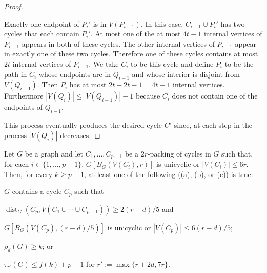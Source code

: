 \documentclass{patmorin}
\renewcommand{\ge}{\geqslant}
\renewcommand{\le}{\leqslant}
\DeclareMathOperator{\dist}{dist}
\begin{document}
\begin{proof}
\begin{compactenum}
    \item Exactly one endpoint of $P_i'$ is in $V(P_{i-1})$.  In this case, $C_{i-1}\cup P_i'$ has two cycles that each contain $P_i'$.  At most one of the at most $4t-1$ internal vertices of $P_{i-1}$ appears in both of these cycles. The other internal vertices of $P_{i-1}$ appear in exactly one of these two cycles.  Therefore one of these cycles contains at most $2t$ internal vertices of $P_{i-1}$.  We take $C_i$ to be this cycle and define $P_i$ to be the path in $C_i$ whose endpoints are in $Q_{i-1}$ and whose interior is disjoint from $V(Q_{i-1})$.  Then $P_i$ has at most $2t+2t-1= 4t-1$ internal vertices.  Furthermore $|V(Q_i)|\le |V(Q_{i-1})|-1$ because $C_i$ does not contain one of the endpoints of $Q_{i-1}$.
  \end{compactenum}
  This process eventually produces the desired cycle $C'$ since, at each step in the process $|V(Q_i)|$ decreases.
\end{proof}





\begin{lem}\label{a_or_b}
  Let $G$ be a graph and let $C_1,\ldots,C_{p-1}$ be a $2r$-packing of cycles in $G$ such that, for each $i\in\{1,\ldots,p-1\}$,  $G[B_G(V(C_i),r)]$ is unicyclic or $|V(C_i)|\le 6r$.  Then, for every $k\ge p-1$, at least one of the following ((a), (b), or (c)) is true:
  \begin{compactenum}[(a)]
    \item $G$ contains a cycle $C_p$ such that
    \begin{compactenum}[(i)]
      \item $\dist_G(C_p,V(C_1\cup\cdots\cup C_{p-1}))\ge 2(r-d)/5$ and
      \item $G[B_G(V(C_p),(r-d)/5)]$ is unicyclic or $|V(C_p)|\le 6(r-d)/5$;
    \end{compactenum}
    \item $\rho_d(G)\ge k$; or
    \item $\tau_{r'}(G) \le f(k)+p-1$ for $r':=\max\{r+2d,7r\}$.
  \end{compactenum}
\end{lem}
\end{document}
